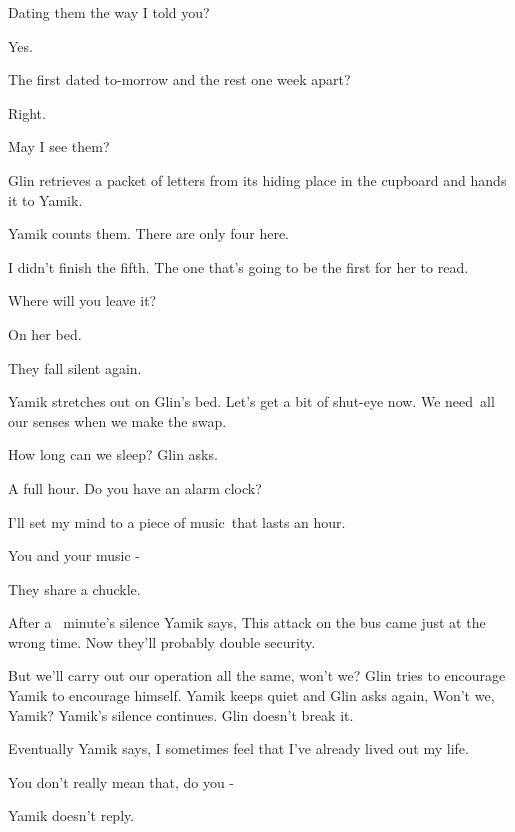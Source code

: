 \documentclass[12pt]{book}
\begin{document}
{\textquotedbl}Dating them the way I told you?{\textquotedbl}

{\textquotedbl}Yes.{\textquotedbl}

{\textquotedbl}The first dated to-morrow and the rest one week apart?{\textquotedbl}

{\textquotedbl}Right.{\textquotedbl}

{\textquotedbl}May I see them?{\textquotedbl}

Glin retrieves a packet of letters from its hiding place in the cupboard and hands it to Yamik.

Yamik counts them. {\textquotedbl}There are only four here.{\textquotedbl}

{\textquotedbl}I didn't finish the fifth. The one that's going to be the first for her to read.{\textquotedbl}

{\textquotedbl}Where will you leave it?{\textquotedbl}

{\textquotedbl}On her bed.{\textquotedbl}

They fall silent again.

Yamik stretches out on Glin's bed. {\textquotedbl}Let's get a bit of shut-eye now. We need~all our senses when we make
the swap.{\textquotedbl}

{\textquotedbl}How long can we sleep?{\textquotedbl} Glin asks.

{\textquotedbl}A full hour. Do you have an alarm clock?{\textquotedbl}

{\textquotedbl}I'll set my mind to a piece of music~that lasts an hour.{\textquotedbl}

{\textquotedbl}You and your music -{\textquotedbl}

They share a chuckle.

After a \ minute's silence Yamik says, {\textquotedbl}This attack on the bus came just at the wrong time. Now they'll
probably double security.{\textquotedbl}

{\textquotedbl}But we'll carry out our operation all the same, won't we?{\textquotedbl} Glin tries to encourage Yamik to
encourage himself. Yamik keeps quiet and Glin asks again, {\textquotedbl}Won't we, Yamik?{\textquotedbl} Yamik's
silence continues. Glin doesn't break it.

Eventually Yamik says, {\textquotedbl}I sometimes feel that I've already lived out my life.{\textquotedbl}

{\textquotedbl}You don't really mean that, do you -{\textquotedbl}

Yamik doesn't reply.
\end{document}
